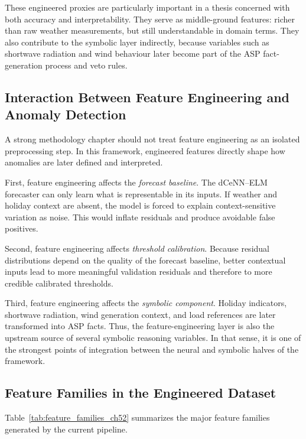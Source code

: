 These engineered proxies are particularly important in a thesis concerned with both accuracy and interpretability. They serve as middle-ground features: richer than raw weather measurements, but still understandable in domain terms. They also contribute to the symbolic layer indirectly, because variables such as shortwave radiation and wind behaviour later become part of the ASP fact-generation process and veto rules.

\subsection{Interaction Between Feature Engineering and Anomaly Detection}

A strong methodology chapter should not treat feature engineering as an isolated preprocessing step. In this framework, engineered features directly shape how anomalies are later defined and interpreted.

First, feature engineering affects the \emph{forecast baseline}. The dCeNN--ELM forecaster can only learn what is representable in its inputs. If weather and holiday context are absent, the model is forced to explain context-sensitive variation as noise. This would inflate residuals and produce avoidable false positives.

Second, feature engineering affects \emph{threshold calibration}. Because residual distributions depend on the quality of the forecast baseline, better contextual inputs lead to more meaningful validation residuals and therefore to more credible calibrated thresholds.

Third, feature engineering affects the \emph{symbolic component}. Holiday indicators, shortwave radiation, wind generation context, and load references are later transformed into ASP facts. Thus, the feature-engineering layer is also the upstream source of several symbolic reasoning variables. In that sense, it is one of the strongest points of integration between the neural and symbolic halves of the framework.
\newpage
\subsection{Feature Families in the Engineered Dataset}

Table~\ref{tab:feature_families_ch52} summarizes the major feature families generated by the current pipeline.

